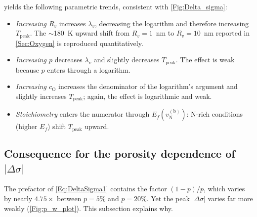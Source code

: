 \documentclass[preprint,12pt,sort&compress]{elsarticle}
\newcommand{\?}{\stackrel{?}{=}}
\begin{document}
 yields the following parametric trends, consistent with \cref{Fig:Delta_sigma}:
\begin{itemize}
    \item \textit{Increasing $R_v$} increases $\lambda_v$, decreasing the logarithm and therefore increasing $T_\text{peak}$. The $\sim$180~K upward shift from $R_v = 1$~nm to $R_v = 10$~nm reported in \cref{Sec:Oxygen} is reproduced quantitatively.
    \item \textit{Increasing $p$} decreases $\lambda_v$ and slightly decreases $T_\text{peak}$. The effect is weak because $p$ enters through a logarithm.
    \item \textit{Increasing $c_\mathrm{O}$} increases the denominator of the logarithm's argument and slightly increases $T_\text{peak}$; again, the effect is logarithmic and weak.
    \item \textit{Stoichiometry} enters the numerator through $E_f(v_\text{N}^{(\text{b})})$: N-rich conditions (higher $E_f$) shift $T_\text{peak}$ upward.
\end{itemize}

\subsection{Consequence for the porosity dependence of \texorpdfstring{$|\Delta \sigma|$}{|Delta sigma|}}
\label{App:Tpeak:Porosity}

The prefactor of \cref{Eq:DeltaSigma1} contains the factor $(1-p)/p$, which varies by nearly $4.75\times$ between $p = 5\%$ and $p = 20\%$. Yet the peak $|\Delta \sigma|$ varies far more weakly (\cref{Fig:p_w_plot}). This subsection explains why.
\end{document}
